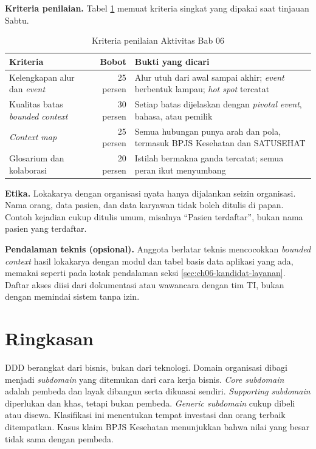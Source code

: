 \textbf{Kriteria penilaian.} Tabel \ref{tab:ch06-kriteria-aktivitas} memuat kriteria singkat yang
dipakai saat tinjauan Sabtu.

\begin{table}[!htb]
  \centering
  \caption{Kriteria penilaian Aktivitas Bab 06}
  \label{tab:ch06-kriteria-aktivitas}
  \footnotesize
  \begin{tabularx}{\textwidth}{>{\raggedright\arraybackslash}X r >{\raggedright\arraybackslash}X}
    \hline
    \textbf{Kriteria} & \textbf{Bobot} & \textbf{Bukti yang dicari} \\ \hline
    Kelengkapan alur dan \textit{event} & 25 persen & Alur utuh dari awal sampai akhir;
      \textit{event} berbentuk lampau; \textit{hot spot} tercatat \\ \hline
    Kualitas batas \textit{bounded context} & 30 persen & Setiap batas dijelaskan dengan
      \textit{pivotal event}, bahasa, atau pemilik \\ \hline
    \textit{Context map} & 25 persen & Semua hubungan punya arah dan pola, termasuk BPJS Kesehatan
      dan SATUSEHAT \\ \hline
    Glosarium dan kolaborasi & 20 persen & Istilah bermakna ganda tercatat; semua peran ikut
      menyumbang \\ \hline
  \end{tabularx}
\end{table}

\textbf{Etika.} Lokakarya dengan organisasi nyata hanya dijalankan seizin organisasi. Nama orang,
data pasien, dan data karyawan tidak boleh ditulis di papan. Contoh kejadian cukup ditulis umum,
misalnya ``Pasien terdaftar'', bukan nama pasien yang terdaftar.

\textbf{Pendalaman teknis (opsional).} Anggota berlatar teknis mencocokkan \textit{bounded context}
hasil lokakarya dengan modul dan tabel basis data aplikasi yang ada, memakai
 seperti pada kotak pendalaman seksi
\ref{sec:ch06-kandidat-layanan}. Daftar akses diisi dari dokumentasi atau wawancara dengan tim TI,
bukan dengan memindai sistem tanpa izin.

\section{Ringkasan}

DDD berangkat dari bisnis, bukan dari teknologi. Domain organisasi dibagi menjadi
\textit{subdomain} yang ditemukan dari cara kerja bisnis. \textit{Core subdomain} adalah pembeda dan
layak dibangun serta dikuasai sendiri. \textit{Supporting subdomain} diperlukan dan khas, tetapi
bukan pembeda. \textit{Generic subdomain} cukup dibeli atau disewa. Klasifikasi ini menentukan
tempat investasi dan orang terbaik ditempatkan. Kasus klaim BPJS Kesehatan menunjukkan bahwa nilai
yang besar tidak sama dengan pembeda.

